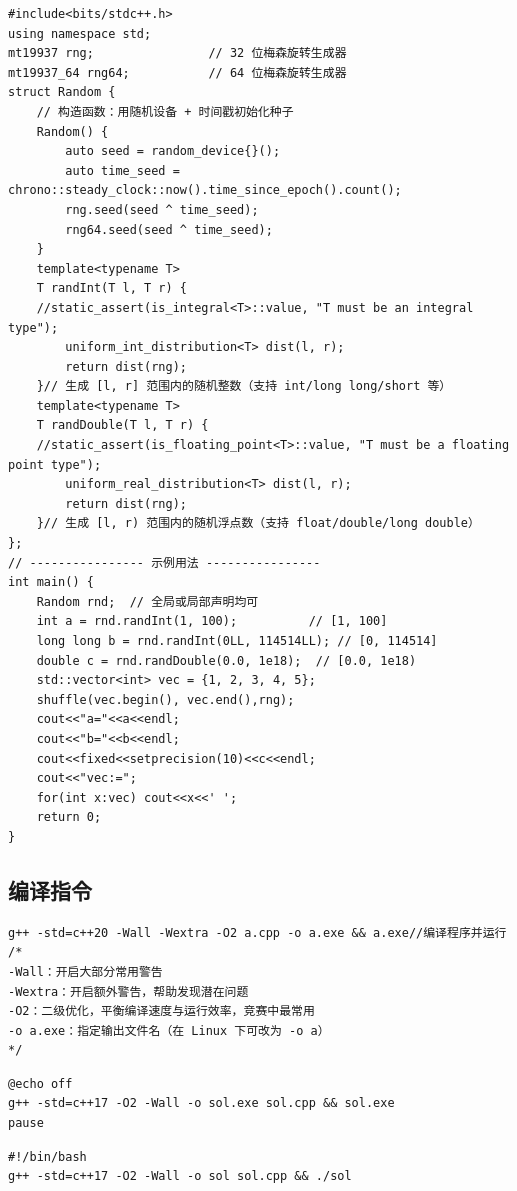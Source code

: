 \documentclass[11pt,a4paper,twocolumn]{ctexart}  %
\begin{document}
\begin{lstlisting}[caption={随机数}]
#include<bits/stdc++.h>
using namespace std;
mt19937 rng;                // 32 位梅森旋转生成器
mt19937_64 rng64;           // 64 位梅森旋转生成器
struct Random {    
    // 构造函数：用随机设备 + 时间戳初始化种子
    Random() {
        auto seed = random_device{}();
        auto time_seed = chrono::steady_clock::now().time_since_epoch().count();
        rng.seed(seed ^ time_seed);
        rng64.seed(seed ^ time_seed);
    }
    template<typename T>
    T randInt(T l, T r) {
    //static_assert(is_integral<T>::value, "T must be an integral type");
        uniform_int_distribution<T> dist(l, r);
        return dist(rng);
    }// 生成 [l, r] 范围内的随机整数（支持 int/long long/short 等）
    template<typename T>
    T randDouble(T l, T r) {
    //static_assert(is_floating_point<T>::value, "T must be a floating point type");
        uniform_real_distribution<T> dist(l, r);
        return dist(rng);
    }// 生成 [l, r) 范围内的随机浮点数（支持 float/double/long double）
};
// ---------------- 示例用法 ----------------
int main() {
    Random rnd;  // 全局或局部声明均可
    int a = rnd.randInt(1, 100);          // [1, 100]
    long long b = rnd.randInt(0LL, 114514LL); // [0, 114514]
    double c = rnd.randDouble(0.0, 1e18);  // [0.0, 1e18)
    std::vector<int> vec = {1, 2, 3, 4, 5};
    shuffle(vec.begin(), vec.end(),rng);
    cout<<"a="<<a<<endl;
    cout<<"b="<<b<<endl;
    cout<<fixed<<setprecision(10)<<c<<endl;
    cout<<"vec:=";
    for(int x:vec) cout<<x<<' ';
    return 0;
}
\end{lstlisting}

\subsection{编译指令}
\begin{lstlisting}[caption={编译指令}]
g++ -std=c++20 -Wall -Wextra -O2 a.cpp -o a.exe && a.exe//编译程序并运行
/*
-Wall：开启大部分常用警告
-Wextra：开启额外警告，帮助发现潜在问题
-O2：二级优化，平衡编译速度与运行效率，竞赛中最常用
-o a.exe：指定输出文件名（在 Linux 下可改为 -o a）
*/
\end{lstlisting}

\begin{lstlisting}[caption={.bat/.cmd (win)批处理文件编译}]
@echo off
g++ -std=c++17 -O2 -Wall -o sol.exe sol.cpp && sol.exe
pause
\end{lstlisting}

\begin{lstlisting}[caption={.sh (linux)文件编译}]
#!/bin/bash
g++ -std=c++17 -O2 -Wall -o sol sol.cpp && ./sol
\end{lstlisting}
\end{document}
